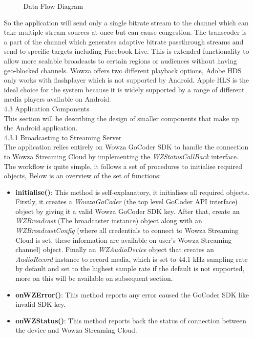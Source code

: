 \documentclass{article}
\begin{document}
\begin{flushleft}
\begin{figure}[!h]
	\caption{Data Flow Diagram}
	\label{fig:data-flow-diagram}
\end{figure}
So the application will send only a single bitrate stream to the channel which can take multiple stream sources at once but can cause congestion. The transcoder is a part of the channel which generates adaptive bitrate passthrough streams and send to specific targets including Facebook Live. This is extended functionality to allow more scalable broadcasts to certain regions or audiences without having geo-blocked channels. Wowza offers two different playback options, Adobe HDS only works with flashplayer which is not supported by Android. Apple HLS is the ideal choice for the system because it is widely supported by a range of different media players available on Android.\\
{\Large 4.3 Application Components}\\
This section will be describing the design of smaller components that make up the Android application.\\
{\large 4.3.1 Broadcasting to Streaming Server}\\
The application relies entirely on Wowza GoCoder SDK to handle the connection to Wowza Streaming Cloud by implementing the \textit{WZStatusCallBack} interface. The workflow is quite simple, it follows a set of procedures to initialise required objects, Below is an overview of the set of functions:
\begin{itemize}
	\item \textbf{initialise()}: This method is self-explanatory, it initialises all required objects. Firstly, it creates a \textit{WowzaGoCoder} (the top level GoCoder API interface) object by giving it a valid Wowza GoCoder SDK key. After that, create an \textit{WZBroadcast} (The broadcaster instance) object along with an \textit{WZBroadcastConfig} (where all credentials to connect to Wowza Streaming Cloud is set, these information are available on user's Wowza Streaming channel) object. Finally an \textit{WZAudioDevice} object that creates an \textit{AudioRecord} instance to record media, which is set to 44.1 kHz sampling rate by default and set to the highest sample rate if the default is not supported, more on this will be available on subsequent section.\\
	\item \textbf{onWZError()}: This method reports any error caused the GoCoder SDK like invalid SDK key.\\
	\item \textbf{onWZStatus()}: This method reports back the status of connection between the device and Wowza Streaming Cloud.\\

\end{itemize}
\end{flushleft}
\end{document}
